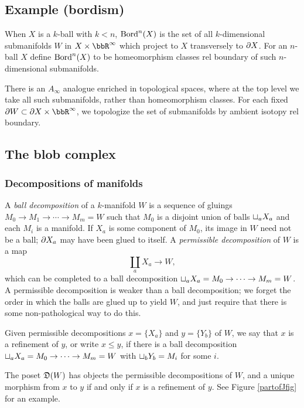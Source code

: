 \documentclass{pnastwo}
\begin{document}
\begin{article}
\subsection{Example (bordism)} \mbox{}
When $X$ is a $k$-ball with $k<n$, $\operatorname{Bord}^n(X)$ is the set of all $k$-dimensional
submanifolds $W$ in $X\times \bbR^\infty$ which project to $X$ transversely
to $\partial X$.
For an $n$-ball $X$ define $\operatorname{Bord}^n(X)$ to be homeomorphism classes rel boundary of such $n$-dimensional submanifolds.

There is an $A_\infty$ analogue enriched in topological spaces, where at the top level we take 
all such submanifolds, rather than homeomorphism classes. 
For each fixed $\bdy W \subset \bdy X \times \bbR^\infty$, we 
topologize the set of submanifolds by ambient isotopy rel boundary.

\subsection{The blob complex}
\subsubsection{Decompositions of manifolds}

A \emph{ball decomposition} of a $k$-manifold $W$ is a 
sequence of gluings $M_0\to M_1\to\cdots\to M_m = W$ such that $M_0$ is a disjoint union of balls
$\sqcup_a X_a$ and each $M_i$ is a manifold.
If $X_a$ is some component of $M_0$, its image in $W$ need not be a ball; $\partial X_a$ may have been glued to itself.
A {\it permissible decomposition} of $W$ is a map
\[
	\coprod_a X_a \to W,
\]
which can be completed to a ball decomposition $\sqcup_a X_a = M_0\to\cdots\to M_m = W$.
A permissible decomposition is weaker than a ball decomposition; we forget the order in which the balls
are glued up to yield $W$, and just require that there is some non-pathological way to do this.

Given permissible decompositions $x = \{X_a\}$ and $y = \{Y_b\}$ of $W$, we say that $x$ is a refinement
of $y$, or write $x \le y$, if there is a ball decomposition $\sqcup_a X_a = M_0\to\cdots\to M_m = W$
with $\sqcup_b Y_b = M_i$ for some $i$.

\begin{defn}
The poset $\mathfrak{D}(W)$ has objects the permissible decompositions of $W$, 
and a unique morphism from $x$ to $y$ if and only if $x$ is a refinement of $y$.
See Figure \ref{partofJfig} for an example.
\end{defn}


\end{article}
\end{document}
